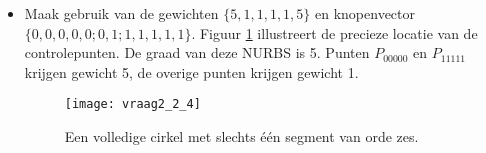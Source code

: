 \begin{enumerate}
	{
		\begin{itemize} 
			\item Maak gebruik van de gewichten $\{5, 1, 1, 1, 1, 5\}$ en knopenvector $\{0, 0, 0, 0, 0; 0, 1; 1,1,1,1,1\}$.  Figuur \ref{fig:vraag2_2_4} illustreert de precieze locatie van de controlepunten. De graad van deze NURBS is 5.  Punten $P_{00000}$ en $P_{11111}$ krijgen gewicht 5, de overige punten krijgen gewicht 1.
			\begin{figure}[ht]
				\centering
				\texttt{[image: vraag2\_2\_4]}
				\caption{Een volledige cirkel met slechts één segment van orde zes.}
				\label{fig:vraag2_2_4} 
			\end{figure}
		\end{itemize}}
\end{enumerate}

